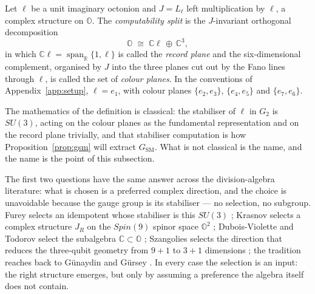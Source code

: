 \begin{definition}
\label{def:computability-split}
Let $\ell$ be a unit imaginary octonion and $J = L_{\ell}$ left
multiplication by $\ell$, a complex structure on $\mathbb{O}$. The
\emph{computability split} is the $J$-invariant orthogonal decomposition
\begin{equation}
  \mathbb{O} \;\cong\; \mathbb{C}\ell \,\oplus\, \mathbb{C}^{3},
  \label{eq:computability-split}
\end{equation}
in which $\mathbb{C}\ell = \operatorname{span}_{\mathbb{R}}\{1,\ell\}$ is
called the \emph{record plane} and the six-dimensional complement,
organised by $J$ into the three planes cut out by the Fano lines through
$\ell$, is called the set of \emph{colour planes}. In the conventions of
Appendix~\ref{app:setup}, $\ell = e_1$, with colour planes
$\{e_2,e_3\}$, $\{e_4,e_5\}$ and $\{e_7,e_6\}$.
\end{definition}

The mathematics of the definition is classical: the stabiliser of $\ell$
in $G_2$ is $SU(3)$, acting on the colour planes as the fundamental
representation and on the record plane trivially, and that stabiliser
computation is how Proposition~\ref{prop:gsm} will extract
$G_{\mathrm{SM}}$. What is not classical is the name, and the name is the
point of this subsection.

The first two questions have the same answer across the division-algebra
literature: what is chosen is a preferred complex direction, and the
choice is unavoidable because the gauge group is its stabiliser --- no
selection, no subgroup. Furey selects an idempotent whose stabiliser is
this $SU(3)$ \autocite{furey2012unified,furey2018three}; Krasnov selects a
complex structure $J_R$ on the $Spin(9)$ spinor space $\mathbb{O}^2$
\autocite{krasnov2021spin9}; Dubois-Violette and Todorov select the
subalgebra $\mathbb{C} \subset \mathbb{O}$
\autocite{duboisviolettetodorov2019exceptional}; Szangolies selects the
direction that reduces the three-qubit geometry from $9{+}1$ to $3{+}1$
dimensions \autocite{szangolies2025standardmodel}; the tradition reaches
back to G\"unaydin and G\"ursey \autocite{gunaydingursey1973}. In every
case the selection is an input: the right structure emerges, but only by
assuming a preference the algebra itself does not contain.

